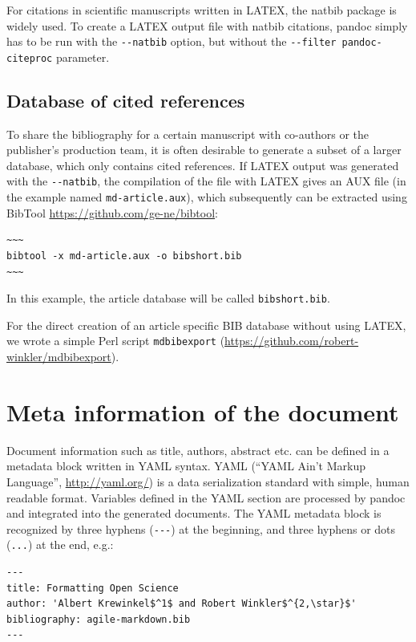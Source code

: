 \documentclass[10pt,fleqn]{wlpeerj}
\begin{document}
For
citations
in
scientific
manuscripts
written
in
LATEX,
the
natbib
package
is
widely
used.
To
create
a
LATEX
output
file
with
natbib
citations,
pandoc
simply
has
to be
run
with
the
\texttt{-\/-natbib}
option,
but
without
the
\texttt{-\/-filter\ pandoc-citeproc}
parameter.

\subsection{Database
of
cited
references}\label{database-of-cited-references}

To
share
the
bibliography
for a
certain
manuscript
with
co-authors
or
the
publisher's
production
team,
it is
often
desirable
to
generate
a
subset
of a
larger
database,
which
only
contains
cited
references.
If
LATEX
output
was
generated
with
the
\texttt{-\/-natbib},
the
compilation
of
the
file
with
LATEX
gives
an
AUX
file
(in
the
example
named
\texttt{md-article.aux}),
which
subsequently
can
be
extracted
using
BibTool
\url{https://github.com/ge-ne/bibtool}:

\begin{verbatim}
~~~
bibtool -x md-article.aux -o bibshort.bib
~~~
\end{verbatim}

In
this
example,
the
article
database
will
be
called
\texttt{bibshort.bib}.

For
the
direct
creation
of an
article
specific
BIB
database
without
using
LATEX,
we
wrote
a
simple
Perl
script
\texttt{mdbibexport}
(\url{https://github.com/robert-winkler/mdbibexport}).

\section{Meta
information
of
the
document}\label{meta-information-of-the-document}

Document
information
such
as
title,
authors,
abstract
etc.
can
be
defined
in a
metadata
block
written
in
YAML
syntax.
YAML
(``YAML
Ain't
Markup
Language'',
\url{http://yaml.org/})
is a
data
serialization
standard
with
simple,
human
readable
format.
Variables
defined
in
the
YAML
section
are
processed
by
pandoc
and
integrated
into
the
generated
documents.
The
YAML
metadata
block
is
recognized
by
three
hyphens
(\texttt{-\/-\/-})
at
the
beginning,
and
three
hyphens
or
dots
(\texttt{...})
at
the
end,
e.g.:

\begin{verbatim}
---
title: Formatting Open Science
author: 'Albert Krewinkel$^1$ and Robert Winkler$^{2,\star}$'
bibliography: agile-markdown.bib
---
\end{verbatim}
\end{document}
